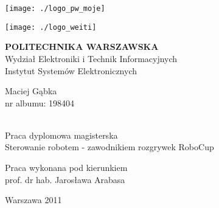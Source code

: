\begin{titlepage}
\linespread{1.1}
\hspace{0.4cm}
 \begin{minipage}{0.4\textwidth}
	\begin{flushleft} 
	\texttt{[image: ./logo\_pw\_moje]}
	\end{flushleft}
\end{minipage}
\begin{minipage}{0.4\textwidth}
	\begin{flushright} 
	\texttt{[image: ./logo\_weiti]}
	\end{flushright}
\end{minipage}
\begin{flushleft}


\end{flushleft}
\vspace{0.1cm}
\begin{center}
{\textbf{\LARGE POLITECHNIKA WARSZAWSKA}}\\
\Large Wydział Elektroniki i Technik Informacyjnych\\
\Large Instytut Systemów Elektronicznych\\[2.5cm]
 \begin{minipage}{0.9\textwidth}
	\begin{flushleft} 
	\Large
	Maciej Gąbka\\nr albumu: 198404
	\end{flushleft}
\end{minipage}
\\[1.5cm]
{\Large Praca dyplomowa magisterska}\\
 \Huge Sterowanie robotem - zawodnikiem rozgrywek RoboCup\\[2.0cm]
\begin{flushleft} \large
\hspace{5.5cm}Praca wykonana pod kierunkiem \\ 
\hspace{5.5cm}prof. dr hab. Jarosława Arabasa
\end{flushleft}
\vfill
{\large Warszawa 2011}
\end{center}
\end{titlepage}
